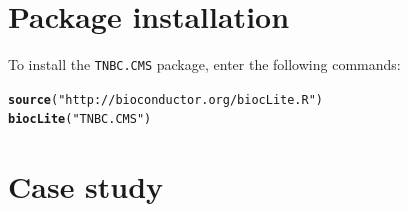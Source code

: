 \documentclass{article}\usepackage[]{graphicx}\usepackage[]{color}
\makeatletter
\newcommand{\hlstr}[1]{\textcolor[rgb]{0.192,0.494,0.8}{#1}}%
\newcommand{\hlstd}[1]{\textcolor[rgb]{0.345,0.345,0.345}{#1}}%
\newcommand{\hlkwd}[1]{\textcolor[rgb]{0.737,0.353,0.396}{\textbf{#1}}}%
\newenvironment{kframe}{%
 \def\at@end@of@kframe{}%
 \ifinner\ifhmode%
  \def\at@end@of@kframe{\end{minipage}}%
  \begin{minipage}{\columnwidth}%
 \fi\fi%
 \def\FrameCommand##1{\hskip\@totalleftmargin \hskip-\fboxsep
 \colorbox{shadecolor}{##1}\hskip-\fboxsep
     \hskip-\linewidth \hskip-\@totalleftmargin \hskip\columnwidth}%
 \MakeFramed {\advance\hsize-\width
   \@totalleftmargin\z@ \linewidth\hsize
   \@setminipage}}%
 {\par\unskip\endMakeFramed%
 \at@end@of@kframe}
\newenvironment{knitrout}{}{} %
\makeatother
\begin{document}
\section{Package installation}
To install the \texttt{TNBC.CMS} package, enter the following commands:
\begin{knitrout}
\color{fgcolor}\begin{kframe}
\begin{alltt}
\hlkwd{source}\hlstd{(}\hlstr{"http://bioconductor.org/biocLite.R"}\hlstd{)}
\hlkwd{biocLite}\hlstd{(}\hlstr{"TNBC.CMS"}\hlstd{)}
\end{alltt}
\end{kframe}
\end{knitrout}

\section{Case study}
\end{document}
